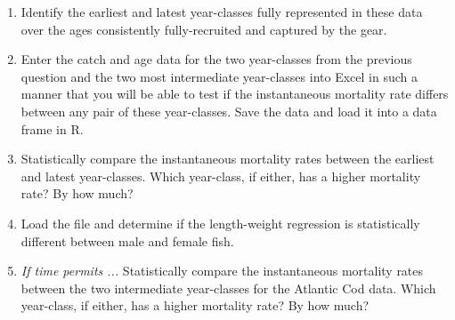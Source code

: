 \documentclass{article}\usepackage[]{graphicx}\usepackage[]{color}
\newif\ifmakekey
\begin{document}
\begin{enumerate}
  \item Identify the earliest and latest year-classes fully represented in these data over the ages consistently fully-recruited and captured by the gear.
\ifmakekey
The earliest and latest year-classes that are fully-represented over ages 4-8 are the 1989 and 1996 year-classes, respectively.
\fi
  \item Enter the catch and age data for the two year-classes from the previous question and the two most intermediate year-classes into Excel in such a manner that you will be able to test if the instantaneous mortality rate differs between any pair of these year-classes.  Save the data and load it into a data frame in R.



  \item Statistically compare the instantaneous mortality rates between the earliest and latest year-classes.  Which year-class, if either, has a higher mortality rate?  By how much?


\ifmakekey
There are statistically different slopes ($p=0.0044$) which implies statistically different mortality rates.  The instantaneous mortality rate for the 1996 year-class is between 0.368 and 1.271 LESS (i.e., shallower slope) than the 1989 year-class.
\fi
  \item Load the  file and determine if the length-weight regression is statistically different between male and female fish.


\ifmakekey
Neither the slopes ($p=0.4997$) nor the intercepts ($p=0.0658$) were statistically significantly different between male and female Lake Trout.  Thus, the length-weight relationship for the sexes can be modeled by a single commone line.
\fi
  \item \textit{If time permits ...} Statistically compare the instantaneous mortality rates between the two intermediate year-classes for the Atlantic Cod data.  Which year-class, if either, has a higher mortality rate?  By how much?


\ifmakekey
There are statistically different slopes ($p=0.0104$) which implies statistically different mortality rates.  The instantaneous mortality rate for the 1994 year-class is between 0.100 and 0.499 LESS (i.e., shallower slope) than the 1993 year-class.
\fi
\end{enumerate}
\end{document}
